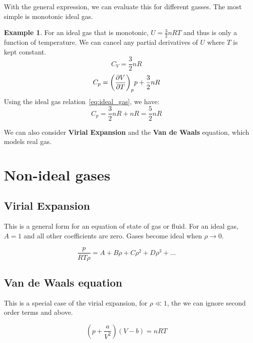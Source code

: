 \documentclass[12pt,chapterprefix=false,dvipsnames]{scrbook}
\theoremstyle{dotless}
\theoremstyle{definition}
\newtheorem{protoexample}{Example}[section]
\newenvironment{example}
{\colorlet{shadecolor}{red!15}\begin{shaded}\begin{protoexample}}
			{\end{protoexample}\end{shaded}}
\begin{document}
With the general expression, we can evaluate this for different
gasses. The most simple is monotonic ideal gas.

\begin{example}
	For an ideal gas that is monotonic, $U = \frac{3}{2}nRT$ and
	thus is only a function of temperature. We can cancel any
	partial derivatives of $U$ where
	$T$ is kept constant.
	\begin{equation}
		C_{V} = \frac{3}{2}nR
	\end{equation}
	\begin{equation}
		C_{p} = {\left(\pdv{V}{T}\right)}_{p}p + \frac{3}{2}nR
	\end{equation}
	Using the ideal gas relation~\ref{eq:ideal_gas}, we have:
	\begin{equation}
		C_{p} = \frac{3}{2}nR + nR = \frac{5}{2}nR
	\end{equation}
\end{example}

We can also consider \textbf{Virial Expansion} and the
\textbf{Van de Waals} equation, which models real gas.

\section{Non-ideal gases}%
\label{sec:non_ideal_gases}

\subsection{Virial Expansion}%
\label{sub:virial_expansion}

This is a general form for an equation of state of gas or fluid.
For an ideal gas, $A = 1$ and all other
coefficients are zero. Gases become ideal when
$\rho \rightarrow 0$.

\begin{equation}
	\label{eq:virial_expansion}
	\frac{p}{RT\rho}
	=
	A + B\rho + C\rho^2 + D\rho^3 + \hdots
\end{equation}

\subsection{Van de Waals equation}%
\label{sub:van_de_waals_equation}

This is a special case of the virial expansion, for
$\rho \ll 1$, the we can ignore second order terms
and above.

\begin{equation}
	\label{eq:van_de_waals}
	\left(p + \frac{a}{V^2}\right)\left(V - b\right)
	=
	nRT
\end{equation}
\end{document}

